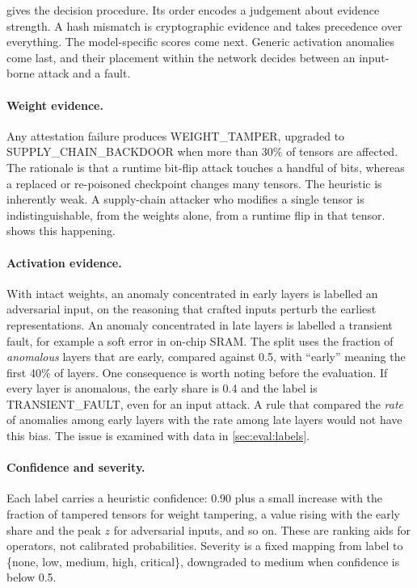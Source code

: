  gives the decision procedure. Its order encodes a judgement about
evidence strength. A hash mismatch is cryptographic evidence and takes precedence over
everything. The model-specific scores come next. Generic activation anomalies come last, and
their placement within the network decides between an input-borne attack and a fault.

\paragraph{Weight evidence.} Any attestation failure produces WEIGHT\_TAMPER, upgraded to
SUPPLY\_CHAIN\_BACKDOOR when more than 30\% of tensors are affected. The rationale is that a
runtime bit-flip attack touches a handful of bits, whereas a replaced or re-poisoned checkpoint
changes many tensors. The heuristic is inherently weak. A supply-chain attacker who modifies a
single tensor is indistinguishable, from the weights alone, from a runtime flip in that tensor.
 shows this happening.

\paragraph{Activation evidence.} With intact weights, an anomaly concentrated in early layers is
labelled an adversarial input, on the reasoning that crafted inputs perturb the earliest
representations. An anomaly concentrated in late layers is labelled a transient fault, for
example a soft error in on-chip SRAM. The split uses the fraction of \emph{anomalous} layers
that are early, compared against 0.5, with ``early'' meaning the first 40\% of layers. One
consequence is worth noting before the evaluation. If every layer is anomalous, the early share
is 0.4 and the label is TRANSIENT\_FAULT, even for an input attack. A rule that compared the
\emph{rate} of anomalies among early layers with the rate among late layers would not have this
bias. The issue is examined with data in \cref{sec:eval:labels}.

\paragraph{Confidence and severity.} Each label carries a heuristic confidence: 0.90 plus a small
increase with the fraction of tampered tensors for weight tampering, a value rising with the
early share and the peak $z$ for adversarial inputs, and so on. These are ranking aids for
operators, not calibrated probabilities. Severity is a fixed mapping from label to
\{none, low, medium, high, critical\}, downgraded to medium when confidence is below 0.5.

